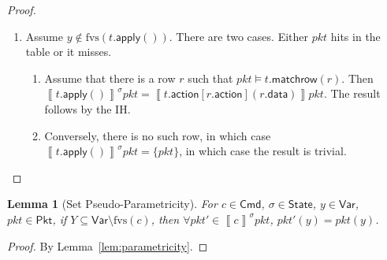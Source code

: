 \documentclass{article}
\newcommand{\pkt}{\mathit{pkt}}
\newcommand{\denote}[1]{\left\llbracket#1\right\rrbracket}
\newcommand{\Cmd}{\mathsf{Cmd}}
\newcommand{\Pkt}{\mathsf{Pkt}}
\newcommand{\Var}{\mathsf{Var}}
\newcommand{\State}{\mathsf{State}}
\newcommand{\action}{\mathsf{action}}
\newcommand{\data}{\mathsf{data}}
\newcommand{\apply}{\mathsf{apply}}
\newcommand{\fvs}{\textrm{fvs}}
\newcommand{\matchrow}{\mathsf{matchrow}}
\theoremstyle{plain}
\newtheorem{lemma}{Lemma}
\theoremstyle{definition}
\theoremstyle{remark}
\begin{document}
\begin{proof}
\begin{enumerate}[align=left]
  \item[$(t.\apply())$] Assume $y \not\in \fvs(t.\apply())$.
    There are two cases. Either $\pkt$ hits in the table or it misses.
    \begin{enumerate}[align=left]
    \item[\textit{Case 1}.] Assume that there is a row $r$ such that $\pkt
      \models t.\matchrow(r)$. Then $\denote{t.\apply()}^\sigma \pkt =
      \denote{t.\action[r.\action](r.\data)} \pkt$. The result follows by the
      IH.

    \item[\textit{Case 2}.] Conversely, there is no such row, in which case
      $\denote{t.\apply()}^\sigma\pkt = \{\pkt\}$, in which case the result is
      trivial.
    \end{enumerate}
  \end{enumerate}
\end{proof}

\begin{lemma}[Set Pseudo-Parametricity]
  \label{lem:parametricity-set}
  For $c \in \Cmd$, $\sigma \in \State$, $y \in \Var$, $\pkt \in \Pkt$, if $Y
  \subseteq \Var \setminus \fvs(c)$, then $\forall \pkt' \in \denote{c}^\sigma
  \pkt$, $\pkt'(y) = \pkt(y)$.
\end{lemma}

\begin{proof}
By Lemma~\ref{lem:parametricity}.
\end{proof}
\end{document}
